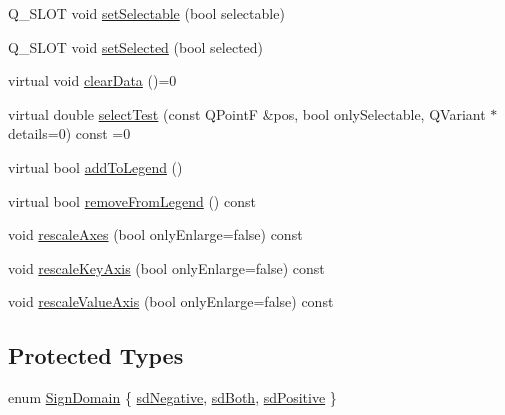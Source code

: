 \begin{DoxyCompactItemize}
Q\+\_\+\+S\+L\+OT void \hyperlink{class_q_c_p_abstract_plottable_a22c69299eb5569e0f6bf084877a37dc4}{set\+Selectable} (bool selectable)
\item 
Q\+\_\+\+S\+L\+OT void \hyperlink{class_q_c_p_abstract_plottable_afbd5428c2952f59d952e11ab5cd79176}{set\+Selected} (bool selected)
\item 
virtual void \hyperlink{class_q_c_p_abstract_plottable_a86e5b8fd4b6ff4f4084e7ea4c573fc53}{clear\+Data} ()=0
\item 
virtual double \hyperlink{class_q_c_p_abstract_plottable_a38efe9641d972992a3d44204bc80ec1d}{select\+Test} (const Q\+PointF \&pos, bool only\+Selectable, Q\+Variant $\ast$details=0) const =0
\item 
virtual bool \hyperlink{class_q_c_p_abstract_plottable_a70f8cabfd808f7d5204b9f18c45c13f5}{add\+To\+Legend} ()
\item 
virtual bool \hyperlink{class_q_c_p_abstract_plottable_ac95fb2604d9106d0852ad9ceb326fe8c}{remove\+From\+Legend} () const
\item 
void \hyperlink{class_q_c_p_abstract_plottable_a1491c4a606bccd2d09e65e11b79eb882}{rescale\+Axes} (bool only\+Enlarge=false) const
\item 
void \hyperlink{class_q_c_p_abstract_plottable_ae96b83c961e257da116c6acf9c7da308}{rescale\+Key\+Axis} (bool only\+Enlarge=false) const
\item 
void \hyperlink{class_q_c_p_abstract_plottable_aa1e408bb2d13999150c3f7f8a8579ca9}{rescale\+Value\+Axis} (bool only\+Enlarge=false) const
\end{DoxyCompactItemize}
\subsection*{Protected Types}
\begin{DoxyCompactItemize}
\item 
enum \hyperlink{class_q_c_p_abstract_plottable_a661743478a1d3c09d28ec2711d7653d8}{Sign\+Domain} \{ \hyperlink{class_q_c_p_abstract_plottable_a661743478a1d3c09d28ec2711d7653d8a0fc9a70796ef60ad18ddd18056e6dc63}{sd\+Negative}, 
\hyperlink{class_q_c_p_abstract_plottable_a661743478a1d3c09d28ec2711d7653d8a082b98cfb91a7363a3b5cd17b0c1cd60}{sd\+Both}, 
\hyperlink{class_q_c_p_abstract_plottable_a661743478a1d3c09d28ec2711d7653d8a02951859f243a4d24e779cfbb5471030}{sd\+Positive}
 \}
\end{DoxyCompactItemize}
